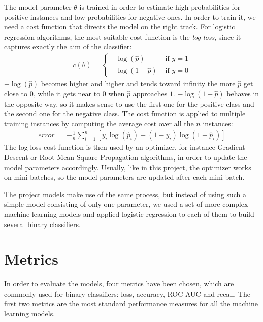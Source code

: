 The model parameter $\theta$ is trained in order to estimate high probabilities for positive instances and low probabilities for negative ones. In order to train it, we need a cost function that directs the model on the right track. For logistic regression algorithms, the most suitable cost function is the \textit{log loss}, since it captures exactly the aim of the classifier:
\begin{align}
    c(\theta) = \left\{\begin{array}{ll}{-\log (\hat{p})} & {\text { if } y=1} \\ {-\log (1-\hat{p})} & {\text { if } y=0}\end{array}\right.
\end{align}
$-\log (\hat{p})$ becomes higher and higher and tends toward infinity the more $\hat{p}$ get close to $0$, while it gets near to $0$ when $\hat{p}$ approaches $1$. $-\log (1-\hat{p})$ behaves in the opposite way, so it makes sense to use the first one for the positive class and the second one for the negative class. The cost function is applied to multiple training instances by computing the average cost over all the $n$ instances:
\begin{align}
    \textit{error } = -\frac{1}{n} \sum^{n}_{i=1}\left[y_i \log(\hat{p}_i) +
    (1 - y_i) \log(1 - \hat{p}_i)\right]
\end{align}
The log loss cost function is then used by an optimizer, for instance Gradient Descent or Root Mean Square Propagation algorithms, in order to update the model parameters accordingly. Usually, like in this project, the optimizer works on mini-batches, so the model parameters are updated after each mini-batch.

The project models make use of the same process, but instead of using such a simple model consisting of only one parameter, we used a set of more complex machine learning models and applied logistic regression to each of them to build several binary classifiers.

\section{Metrics} \label{sec: metrics}
\paragraph{} In order to evaluate the models, four metrics have been chosen, which are commonly used for binary classifiers: loss, accuracy, ROC-AUC and recall. The first two metrics are the most standard performance measures for all the machine learning models.

